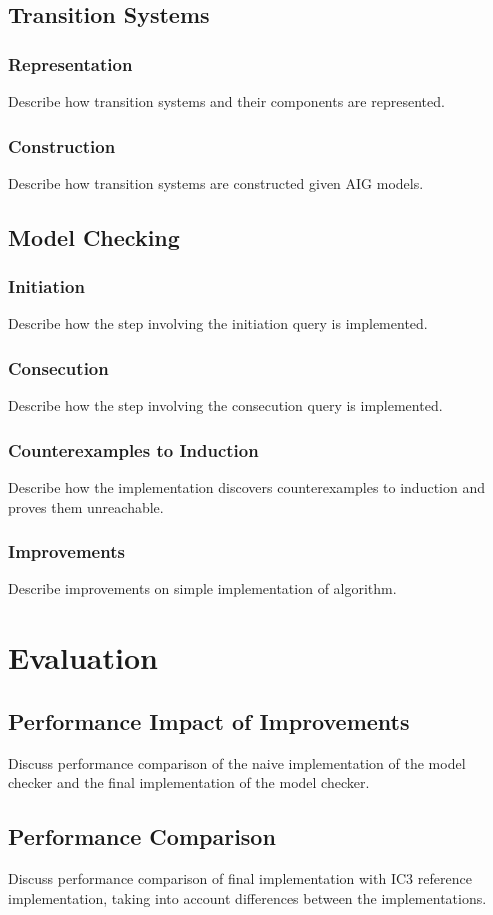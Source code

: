 \documentclass[12pt,a4paper,twoside,openright]{report}
\begin{document}
\section{Transition Systems}
\subsection{Representation}
Describe how transition systems and their components are represented.
\subsection{Construction}
Describe how transition systems are constructed given AIG models.

\section{Model Checking}
\subsection{Initiation}
Describe how the step involving the initiation query is implemented.
\subsection{Consecution}
Describe how the step involving the consecution query is implemented.
\subsection{Counterexamples to Induction}
Describe how the implementation discovers counterexamples
to induction and proves them unreachable.
\subsection{Improvements}
Describe improvements on simple implementation of algorithm.

\chapter{Evaluation}
\section{Performance Impact of Improvements}
Discuss performance comparison of the naive implementation of the
model checker and the final implementation of the model checker.

\section{Performance Comparison}
Discuss performance comparison of final implementation with
IC3 reference implementation, taking into account differences between
the implementations.
\end{document}
